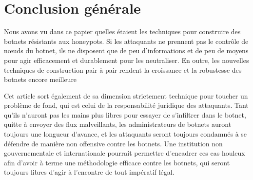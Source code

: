 \section*{Conclusion générale}

Nous avons vu dans ce papier quelles étaient les techniques pour construire
des botnets résistants aux honeypots. Si
les attaquants ne prennent pas le contrôle de nœuds du botnet,
ils ne disposent que de peu d'informations et de peu de moyens pour agir efficacement
et durablement pour les neutraliser. En outre, les nouvelles techniques de construction
pair à pair rendent la croissance et la robustesse des botnets encore meilleure

Cet article sort également de sa dimension strictement technique pour toucher un
problème de fond, qui est celui de la responsabilité juridique des attaquants.
Tant qu'ils n'auront pas les mains plus libres pour essayer de s'infiltrer dans
le botnet, quitte à envoyer des flux malveillants, les administrateurs de
botnets auront toujours une longueur d'avance, et les attaquants seront toujours
condamnés à se défendre de manière non offensive contre les botnets.  Une
institution non gouvernementale et internationale pourrait permettre d'encadrer
ces cas houleux afin d'avoir à terme une méthodologie efficace contre les
botnets, qui seront toujours libres d'agir à l'encontre de tout impératif légal.
